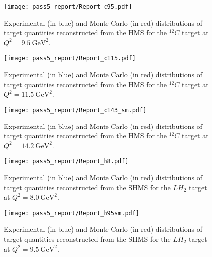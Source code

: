 \begin{figure}[!h]
    \centering
    \texttt{[image: pass5\_report/Report\_c95.pdf]}
    \caption{
            Experimental (in blue) and Monte Carlo (in red) distributions of
            target quantities reconstructed from the HMS for
            the ${}^{12}C$ target at $Q^2=\SI{9.5}{\giga\electronvolt\squared}$.
            }
    \label{fig:Report_c95.pdf_pg1}
\end{figure}


\begin{figure}[!h]
    \centering
    \texttt{[image: pass5\_report/Report\_c115.pdf]}
    \caption{
            Experimental (in blue) and Monte Carlo (in red) distributions of
            target quantities reconstructed from the HMS for
            the ${}^{12}C$ target at $Q^2=\SI{11.5}{\giga\electronvolt\squared}$.
            }
    \label{fig:Report_c115.pdf_pg1}
\end{figure}


\begin{figure}[!h]
    \centering
    \texttt{[image: pass5\_report/Report\_c143\_sm.pdf]}
    \caption{
            Experimental (in blue) and Monte Carlo (in red) distributions of
            target quantities reconstructed from the HMS for
            the ${}^{12}C$ target at $Q^2=\SI{14.2}{\giga\electronvolt\squared}$.
            }
    \label{fig:Report_c143_sm.pdf_pg1}
\end{figure}


\begin{figure}[!h]
    \centering
    \texttt{[image: pass5\_report/Report\_h8.pdf]}
    \caption{
            Experimental (in blue) and Monte Carlo (in red) distributions of
            target quantities reconstructed from the SHMS for
            the $LH_2$ target at $Q^2=\SI{8.0}{\giga\electronvolt\squared}$.
            }
    \label{fig:Report_h8.pdf_pg2}
\end{figure}


\begin{figure}[!h]
    \centering
    \texttt{[image: pass5\_report/Report\_h95sm.pdf]}
    \caption{
            Experimental (in blue) and Monte Carlo (in red) distributions of
            target quantities reconstructed from the SHMS for
            the $LH_2$ target at $Q^2=\SI{9.5}{\giga\electronvolt\squared}$.
            }
    \label{fig:Report_h95sm.pdf_pg2}
\end{figure}


